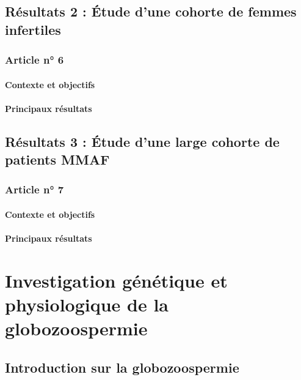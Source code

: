 \documentclass[12pt,twoside]{ugathesis}
\begin{document}
\section{Résultats 2 : Étude d'une cohorte de femmes
infertiles}\label{resultats-2-etude-dune-cohorte-de-femmes-infertiles}

\subsection{Article n° 6}\label{article-n-6}

\subsubsection{Contexte et objectifs}\label{contexte-et-objectifs-3}

\subsubsection{Principaux résultats}\label{principaux-resultats-3}

\section{Résultats 3 : Étude d'une large cohorte de patients
MMAF}\label{resultats-3-etude-dune-large-cohorte-de-patients-mmaf}

\subsection{Article n° 7}\label{article-n-7}

\subsubsection{Contexte et objectifs}\label{contexte-et-objectifs-4}

\subsubsection{Principaux résultats}\label{principaux-resultats-4}

\chapter{Investigation génétique et physiologique de la
globozoospermie}\label{globo}

\section{Introduction sur la
globozoospermie}\label{introduction-sur-la-globozoospermie}
\end{document}
